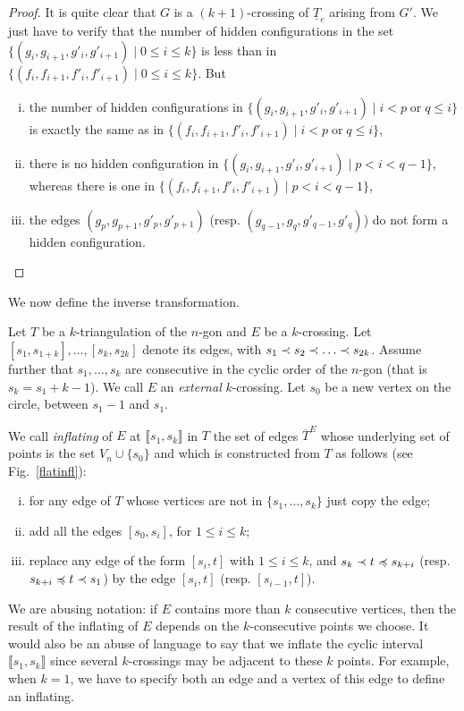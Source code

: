\documentclass[12pt]{amsart}
\begin{document}
\begin{proof}
It is quite clear that $G$ is a $(k+1)$-crossing of $\underline{T}_e$ arising from $G'$. We just have to verify that the number of hidden configurations in the set $\{(g_i,g_{i+1},g'_i,g'_{i+1})\;|\; 0\le i\le k\}$ is less than in $\{(f_i,f_{i+1},f'_i,f'_{i+1})\;|\; 0\le i\le k\}$. But
\begin{enumerate}[(i)]
\item the number of hidden configurations in $\{(g_i,g_{i+1},g'_i,g'_{i+1})\;|\; i<p\;\mathrm{or}\; q\le i\}$ is exactly the same as in $\{(f_i,f_{i+1},f'_i,f'_{i+1})\;|\; i<p\;\mathrm{or}\; q\le i\}$,
\item there is no hidden configuration in $\{(g_i,g_{i+1},g'_i,g'_{i+1})\;|\; p<i<q-1\}$, whereas there is one in $\{(f_i,f_{i+1},f'_i,f'_{i+1})\;|\; p<i<q-1\}$,
\item the edges $(g_p,g_{p+1},g'_p,g'_{p+1})$ (resp. $(g_{q-1},g_q,g'_{q-1},g'_q)$) do not form a hidden configuration.
\end{enumerate}
\end{proof}

\medskip
We now define the inverse transformation.

\begin{definition}
Let $T$ be a $k$-triangulation of the $n$-gon and $E$ be a $k$-crossing. Let $[s_1,s_{1+k}],\ldots,[s_k,s_{2k}]$ denote its edges, with $s_1\prec s_2 \prec \ldots \prec s_{2k}$. Assume further that $s_1,\ldots,s_k$ are consecutive in the cyclic order of the $n$-gon (that is $s_k=s_1+k-1$). We call $E$ an \emph{external} $k$-crossing.
Let $s_0$ be a new vertex on the circle, between $s_1-1$ and $s_1$.

We call \emph{inflating} of $E$ at $\llbracket s_1,s_k\rrbracket$ in $T$ the set of edges $\overline{T}^E$ whose underlying set of points is the set $V_n\cup\{s_0\}$ and which is constructed from $T$ as follows (see Fig.~\ref{flatinfl}):
\begin{enumerate}[(i)]
\item for any edge of $T$ whose vertices are not in $\{s_1,\ldots,s_k\}$ just copy the edge;
\item add all the edges $[s_0,s_i]$, for $1\le i\le k$;
\item replace any edge of the form $[s_i,t]$ with $1\le i\le k$, and $s_k\prec t \preccurlyeq s_{k+i}$ (resp. $s_{k+i}\preccurlyeq t\prec s_1$) by the edge $[s_i,t]$ (resp. $[s_{i-1},t]$).
\end{enumerate}
\end{definition}


\begin{remark}
\rm
We are abusing notation: if $E$ contains more than $k$ consecutive vertices, then the result of the inflating of $E$ depends on the $k$-consecutive points we choose. It would also be an abuse of language to say that we inflate the cyclic interval $\llbracket s_1,s_k\rrbracket$ since several $k$-crossings may be adjacent to these $k$ points. For example, when $k=1$, we have to specify both an edge and a vertex of this edge to define an inflating.
\end{remark}
\end{document}
